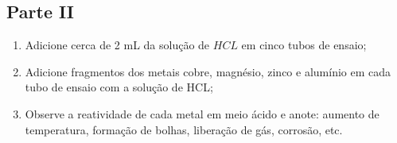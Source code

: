 \begin{itemize}
\begin{enumerate}
 \end{enumerate}

 \subsection{Parte II}
 \begin{enumerate}
  \item Adicione cerca de 2 mL da solução de $HCL$ em cinco tubos de ensaio;
  \item Adicione fragmentos dos metais cobre, magnésio, zinco e alumínio em cada tubo de ensaio com a solução de HCL;
  \item Observe a reatividade de cada metal em meio ácido e anote: aumento de temperatura, formação de bolhas, liberação de gás, corrosão, etc.

 \end{enumerate}

\end{itemize}
